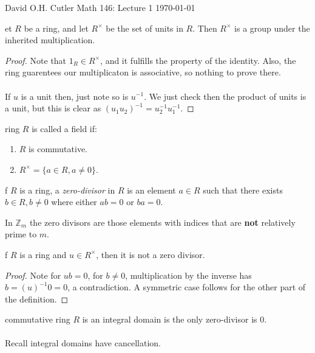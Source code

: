 \documentclass[12pt]{article}
\newcommand{\Z}{\mathbb{Z}}
\newenvironment{lemma}[2][Lemma]{\begin{trivlist}
    \item[\hskip \labelsep {\bfseries #1}\hskip \labelsep {\bfseries #2.}]}{\end{trivlist}}
\newenvironment{definition}[2][Definition]{\begin{trivlist}
    \item[\hskip \labelsep {\bfseries #1}\hskip \labelsep {\bfseries #2.}]}{\end{trivlist}}
\newenvironment{example}[1][Example]{\begin{trivlist}
    \item[\hskip \labelsep {\bfseries #1:}]}{\end{trivlist}}
\begin{document}
\noindent David O.H. Cutler \hfill {\Large Math 146: Lecture 1} \hfill \today

\begin{lemma}[(The Units of a Ring form a Group)]
    Let $R$ be a ring, and let $R^{\times}$ be the set of units in $R$. Then $R^{\times}$ is a group under the inherited multiplication.
    \begin{proof}
        Note that $1_R \in R^{\times}$, and it fulfills the property of the identity. Also, the ring guarentees our multiplicaton is associative, so nothing to prove there. \\ \\
        If $u$ is a unit then, just note so is $u^{-1}$. We just check then the product of units is a unit, but this is clear as $(u_1u_2)^{-1} = u_2^{-1}u_1^{-1}$. 
    \end{proof}
\end{lemma}

\begin{definition}
    A ring $R$ is called a field if:
    \begin{enumerate}
        \item $R$ is commutative.
        \item $R^{\times} = \{a \in R, a \neq 0\}$.
    \end{enumerate}
\end{definition}

\begin{definition}
    If $R$ is a ring, a \textit{zero-divisor} in $R$ is an element $a \in R$ such that there exists $b \in R, b \neq 0$ where either $ab = 0$ or $ba = 0$.
\end{definition}

\begin{example}
    In $\Z_m$ the zero divisors are those elements with indices that are \textbf{not} relatively prime to $m$.
\end{example}

\begin{lemma}
    If $R$ is a ring and $u \in R^\times$, then it is not a zero divisor. 
    \begin{proof}
        Note for $ub = 0$, for $b \neq 0$, multiplication by the inverse has $b = (u)^{-1}0 = 0$, a contradiction. A symmetric case follows for the other part of the definition.
    \end{proof}
\end{lemma}

\begin{definition}
    A commutative ring $R$ is an integral domain is the only zero-divisor is $0$. 
    \\ \\ Recall integral domains have cancellation. 
\end{definition}
\end{document}
